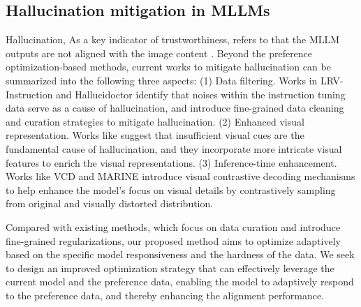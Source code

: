 \subsection{Hallucination mitigation in MLLMs}
Hallucination, As a key indicator of trustworthiness, refers to that the MLLM outputs are not aligned with the image content \cite{hallucination-survey}. Beyond the preference optimization-based methods, current works to mitigate hallucination can be summarized into the following three aspects: 
(1) Data filtering. Works in LRV-Instruction \cite{LRV-Instruction} and Hallucidoctor \cite{Hallucidoctor} identify that noises within the instruction tuning data serve as a cause of hallucination, and introduce fine-grained data cleaning and curation strategies to mitigate hallucination.
(2) Enhanced visual representation. Works like \cite{Vcoder, MMVP} suggest that insufficient visual cues are the fundamental cause of hallucination, and they incorporate more intricate visual features to enrich the visual representations.
(3) Inference-time enhancement. Works like VCD \cite{VCD} and MARINE \cite{CFG} introduce visual contrastive decoding mechanisms to help enhance the model's focus on visual details by contrastively sampling from original and visually distorted distribution.

Compared with existing methods, which focus on data curation and introduce fine-grained regularizations, our proposed method aims to optimize adaptively based on the specific model responsiveness and the hardness of the data. 
We seek to design an improved optimization strategy that can effectively leverage the current model and the preference data, enabling the model to adaptively respond to the preference data, and thereby enhancing the alignment performance.